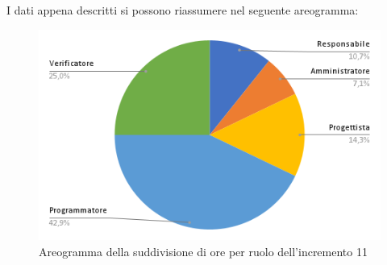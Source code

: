 \pagebreak
I dati appena descritti si possono riassumere nel seguente areogramma:
\begin{figure}[!h]
    \vspace{5px}
    \includegraphics[scale=0.5]{../../../Images/Diagrammi/Diagramma a torta/areogrammaIncremento11.png}
    \centering
    \caption{Areogramma della suddivisione di ore per ruolo dell'incremento 11}
\end{figure}

